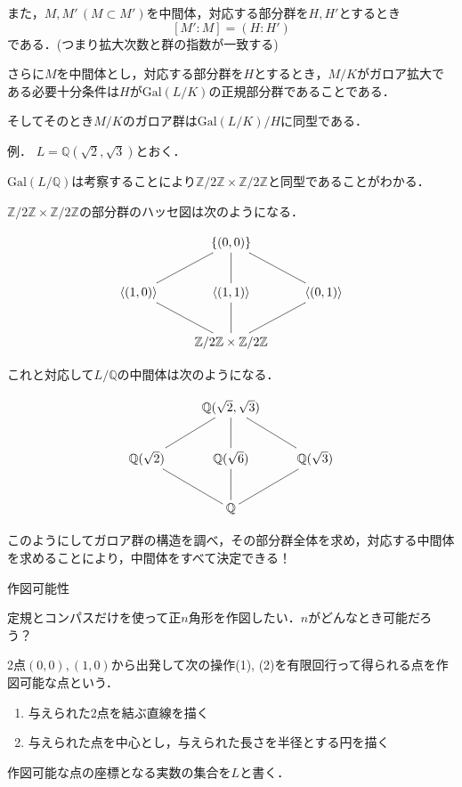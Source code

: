 \documentclass[dvipdfmx,17pt]{beamer}
\theoremstyle{plain}
\newcommand{\Z}{\mathbb{Z}}
\newcommand{\Q}{\mathbb{Q}}
\begin{document}
\begin{frame}
また，$M, M'\, (M \subset M')$を中間体，対応する部分群を$H, H'$とするとき
\[[M': M] = (H : H')\]
である．(つまり拡大次数と群の指数が一致する)
\end{frame}

\begin{frame}
さらに$M$を中間体とし，対応する部分群を$H$とするとき，$M/K$がガロア拡大である必要十分条件は$H$が$\mathrm{Gal}(L/K)$の正規部分群であることである．

そしてそのとき$M/K$のガロア群は$\mathrm{Gal}(L/K)/H$に同型である．
\end{frame}



\begin{frame}
例． $L = \Q(\sqrt{2}, \sqrt{3})$とおく．

$\mathrm{Gal}(L/\Q)$は考察することにより$\Z/2\Z \times \Z/2\Z$と同型であることがわかる．

$\Z/2\Z \times \Z/2\Z$の部分群のハッセ図は次のようになる．


{\small
\[\xymatrix{
& \{(0,0)\} & \\
\langle(1,0)\rangle \ar@{-}[ur] & \langle(1,1)\rangle \ar@{-}[u] & \langle(0,1)\rangle \ar@{-}[ul] \\
& \Z/2\Z \times \Z/2\Z \ar@{-}[ur] \ar@{-}[u] \ar@{-}[ul]
}\]}
\end{frame}

\begin{frame}
これと対応して$L/\Q$の中間体は次のようになる．

{\small
\[\xymatrix{
& \mathbb{Q}(\sqrt 2, \sqrt 3) & \\
\mathbb{Q}(\sqrt 2) \ar@{-}[ur] & \mathbb{Q}(\sqrt 6) \ar@{-}[u] & \mathbb{Q}(\sqrt 3) \ar@{-}[ul] \\
& \mathbb{Q} \ar@{-}[ur] \ar@{-}[u] \ar@{-}[ul]
}\]}

このようにしてガロア群の構造を調べ，その部分群全体を求め，対応する中間体を求めることにより，中間体をすべて決定できる！
\end{frame}

\begin{frame}
{\huge 作図可能性}
\end{frame}

\begin{frame}
定規とコンパスだけを使って正$n$角形を作図したい．$n$がどんなとき可能だろう？
\end{frame}

\begin{frame}
2点$(0,0), (1,0)$から出発して次の操作(1), (2)を有限回行って得られる点を作図可能な点という．
\begin{enumerate}
\item 与えられた2点を結ぶ直線を描く
\item 与えられた点を中心とし，与えられた長さを半径とする円を描く
\end{enumerate}
作図可能な点の座標となる実数の集合を$L$と書く．
\end{frame}
\end{document}

